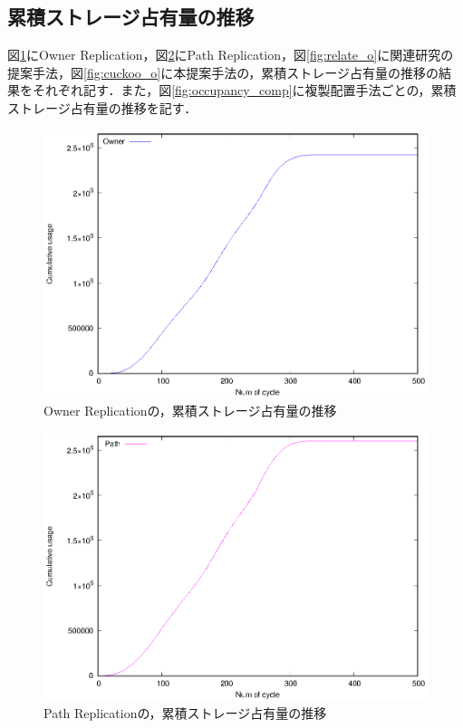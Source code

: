 \documentclass[11pt]{jreport}
\begin{document}
\subsection{累積ストレージ占有量の推移}
図\ref{fig:owner_o}にOwner Replication，図\ref{fig:path_o}にPath Replication，図\ref{fig:relate_o}に関連研究の提案手法，図\ref{fig:cuckoo_o}に本提案手法の，累積ストレージ占有量の推移の結果をそれぞれ記す．また，図\ref{fig:occupancy_comp}に複製配置手法ごとの，累積ストレージ占有量の推移を記す．

\begin{figure}[H]
	\begin{center}
		\includegraphics[width=15.0cm]{./figure/owner_occupancy.eps}
	\end{center}
	\caption{Owner Replicationの，累積ストレージ占有量の推移}
	\label{fig:owner_o}
\end{figure}

\begin{figure}[H]
	\begin{center}
		\includegraphics[width=15.0cm]{./figure/path_occupancy.eps}
	\end{center}
	\caption{Path Replicationの，累積ストレージ占有量の推移}
	\label{fig:path_o}
\end{figure}
\end{document}
